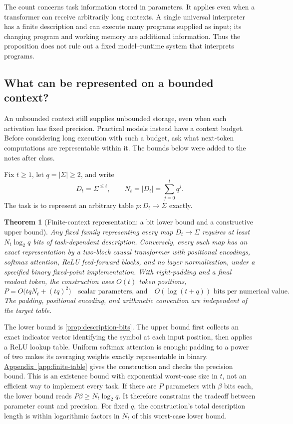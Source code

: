 \documentclass[11pt,twoside]{article}
\newcommand{\appendixref}[1]{\hyperref[#1]{Appendix~\ref*{#1}}}
\newtheorem{theorem}{Theorem}[section]
\theoremstyle{definition}
\theoremstyle{remark}
\begin{document}
The count concerns task information stored in parameters. It applies even
when a transformer can receive arbitrarily long contexts. A single
universal interpreter has a finite description and can execute many
programs supplied as input; its changing program and working memory are
additional information. Thus the proposition does not rule out a fixed
model--runtime system that interprets programs.

\subsection{What can be represented on a bounded context?}
\label{sec:finite-table}

An unbounded context still supplies unbounded storage, even when each
activation has fixed precision. Practical models instead have a context
budget. Before considering long execution with such a budget, ask what
next-token computations are representable within it. The bounds below
were added to the notes after class.

Fix $t\geq1$, let $q=|\Sigma|\geq2$, and write
\begin{equation}
 D_t=\Sigma^{\leq t},\qquad N_t=|D_t|=\sum_{j=0}^tq^j.
 \label{eq:finite-context-domain}
\end{equation}
The task is to represent an arbitrary table $p:D_t\to\Sigma$ exactly.

\begin{theorem}[Finite-context representation: a bit lower bound and a constructive upper bound]
\label{thm:finite-table}
Any fixed family representing every map $D_t\to\Sigma$ requires at least
$N_t\log_2q$ bits of task-dependent description.
Conversely, every such map has an exact representation by a two-block
causal transformer with positional encodings, softmax attention, ReLU
feed-forward blocks, and no layer normalization, under a specified binary
fixed-point implementation. With right-padding and a final readout token,
the construction uses $O(t)$ token positions,
\begin{equation}
 P=O\bigl(tqN_t+(tq)^2\bigr)
 \quad\text{scalar parameters, and}\quad
 O(\log(t+q))\text{ bits per numerical value}.
 \label{eq:finite-table-cost}
\end{equation}
The padding, positional encoding, and arithmetic convention are independent
of the target table.
\end{theorem}

The lower bound is \cref{prop:description-bits}. The upper bound first
collects an exact indicator vector identifying the symbol at each input
position, then applies a ReLU lookup table. Uniform softmax attention is
enough: padding to a power of two makes its averaging weights exactly
representable in binary. \appendixref{app:finite-table} gives the construction and
checks the precision bound. This is an existence bound with exponential
worst-case size in $t$, not an efficient way to implement every task.
If there are $P$ parameters with $\beta$ bits each, the lower bound reads
$P\beta\geq N_t\log_2q$. It therefore constrains the tradeoff between
parameter count and precision. For fixed $q$, the construction's total
description length is within logarithmic factors in $N_t$ of this
worst-case lower bound.
\end{document}
